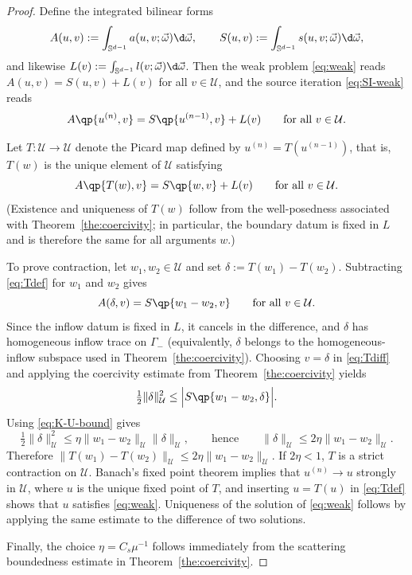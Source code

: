 \documentclass[final]{amsart}
\begin{document}
\begin{proof}
Define the integrated bilinear forms
\[
  A(u,v) := \int_{\mathbb S^{d-1}} a(u,v;\vec\omega) \d\vec\omega,
  \qquad
  S(u,v) := \int_{\mathbb S^{d-1}} s(u,v;\vec\omega) \d\vec\omega,
\]
and likewise $L(v):=\int_{\mathbb S^{d-1}}l(v;\vec\omega) \d\vec\omega$.
Then the weak problem \eqref{eq:weak} reads $A(u,v)=S(u,v)+L(v)$ for all
$v\in\mathcal U$, and the source iteration \eqref{eq:SI-weak} reads
\begin{equation*}
  A\qp{u^{(n)},v} = S\qp{u^{(n-1)},v}+L(v)\qquad\text{for all }v\in\mathcal U.
\end{equation*}

Let $T:\mathcal U\to\mathcal U$ denote the Picard map defined by
$u^{(n)}=T(u^{(n-1)})$, that is, $T(w)$ is the unique element of
$\mathcal U$ satisfying
\begin{equation}
  \label{eq:Tdef}
  A\qp{T(w),v} = S\qp{w,v}+L(v)\qquad\text{for all }v\in\mathcal U.
\end{equation}
(Existence and uniqueness of $T(w)$ follow from the well-posedness
associated with Theorem~\ref{the:coercivity}; in particular, the boundary
datum is fixed in $L$ and is therefore the same for all arguments $w$.)

To prove contraction, let $w_1,w_2\in\mathcal U$ and set
$\delta := T(w_1)-T(w_2)$. Subtracting \eqref{eq:Tdef} for $w_1$ and $w_2$
gives
\begin{equation}
  \label{eq:Tdiff}
  A(\delta,v) = S\qp{w_1-w_2,v}\qquad\text{for all }v\in\mathcal U.
\end{equation}
Since the inflow datum is fixed in $L$, it cancels in the difference, and
$\delta$ has homogeneous inflow trace on $\Gamma_-$ (equivalently,
$\delta$ belongs to the homogeneous-inflow subspace used in
Theorem~\ref{the:coercivity}). Choosing $v=\delta$ in \eqref{eq:Tdiff} and
applying the coercivity estimate from Theorem~\ref{the:coercivity} yields
\begin{equation}
  \label{eq:Tcoerc}
  \tfrac12 \|\delta\|_{\mathcal U}^2 \le \Big|S\qp{w_1-w_2,\delta}\Big|.
\end{equation}
Using \eqref{eq:K-U-bound} gives
\[
  \tfrac12 \|\delta\|_{\mathcal U}^2
  \le
  \eta \|w_1-w_2\|_{\mathcal U} \|\delta\|_{\mathcal U},
  \qquad\text{hence}\qquad
  \|\delta\|_{\mathcal U}\le 2\eta \|w_1-w_2\|_{\mathcal U}.
\]
Therefore $\|T(w_1)-T(w_2)\|_{\mathcal U}\le 2\eta \|w_1-w_2\|_{\mathcal U}$.
If $2\eta<1$, $T$ is a strict contraction on $\mathcal U$. Banach's fixed
point theorem implies that $u^{(n)}\to u$ strongly in $\mathcal U$, where
$u$ is the unique fixed point of $T$, and inserting $u=T(u)$ in
\eqref{eq:Tdef} shows that $u$ satisfies \eqref{eq:weak}. Uniqueness of
the solution of \eqref{eq:weak} follows by applying the same estimate to
the difference of two solutions.

Finally, the choice $\eta=C_s\mu^{-1}$ follows immediately from the
scattering boundedness estimate in Theorem~\ref{the:coercivity}.
\end{proof}
\end{document}
